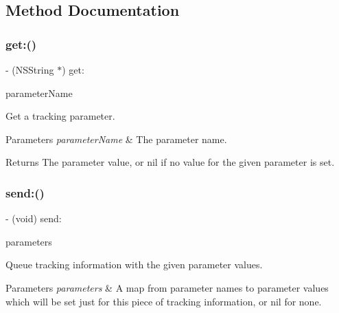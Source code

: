 \subsection{Method Documentation}
\mbox{\label{protocol_g_a_i_tracker-p_aa5fb31f74edfc74533cd3f6a12f7bb46}} 
\subsubsection{\texorpdfstring{get\+:()}{get:()}}
{\footnotesize\ttfamily -\/ (N\+S\+String $\ast$) get\+: \begin{DoxyParamCaption}\item[{(N\+S\+String $\ast$)}]{parameter\+Name }\end{DoxyParamCaption}}

Get a tracking parameter.


\begin{DoxyParams}{Parameters}
{\em parameter\+Name} & The parameter name.\\
\hline
\end{DoxyParams}
\begin{DoxyReturn}{Returns}
The parameter value, or nil if no value for the given parameter is set. 
\end{DoxyReturn}
\mbox{\label{protocol_g_a_i_tracker-p_ae200c9432a91242cf4e1e4917f353c14}} 
\subsubsection{\texorpdfstring{send\+:()}{send:()}}
{\footnotesize\ttfamily -\/ (void) send\+: \begin{DoxyParamCaption}\item[{(N\+S\+Dictionary $\ast$)}]{parameters }\end{DoxyParamCaption}}

Queue tracking information with the given parameter values.


\begin{DoxyParams}{Parameters}
{\em parameters} & A map from parameter names to parameter values which will be set just for this piece of tracking information, or nil for none. \\
\hline
\end{DoxyParams}
\mbox{\label{protocol_g_a_i_tracker-p_aa96612a73d5adf1e0092246de248716e}} 
